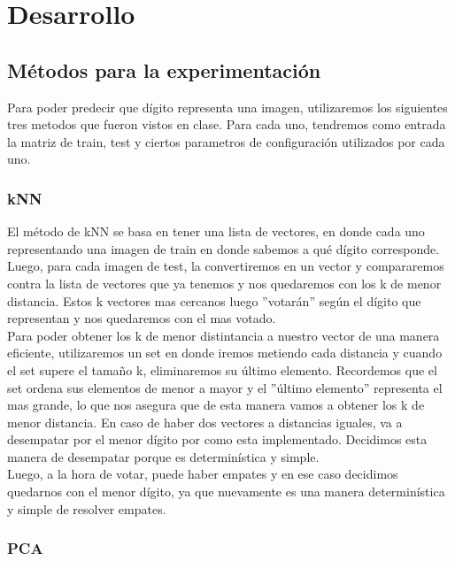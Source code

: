 \section{Desarrollo}

\subsection{M\'etodos para la experimentaci\'on}

Para poder predecir que d\'igito representa una imagen, utilizaremos los siguientes tres metodos que fueron vistos en clase. Para cada uno, tendremos como entrada la matriz de train, test y ciertos parametros de configuraci\'on utilizados por cada uno.

\subsubsection{kNN}

El m\'etodo de kNN se basa en tener una lista de vectores, en donde cada uno representando una imagen de train en donde sabemos a qu\'e d\'igito corresponde. Luego, para cada imagen de test, la convertiremos en un vector y compararemos contra la lista de vectores que ya tenemos y nos quedaremos con los k de menor distancia. Estos k vectores mas cercanos luego ''votar\'an'' seg\'un el d\'igito que representan y nos quedaremos con el mas votado.\\

Para poder obtener los k de menor distintancia a nuestro vector de una manera eficiente, utilizaremos un set en donde iremos metiendo cada distancia y cuando el set supere el tama\~no k, eliminaremos su \'ultimo elemento. Recordemos que el set ordena sus elementos de menor a mayor y el ''\'ultimo elemento'' representa el mas grande, lo que nos asegura que de esta manera vamos a obtener los k de menor distancia. En caso de haber dos vectores a distancias iguales, va a desempatar por el menor d\'igito por como esta implementado. Decidimos esta manera de desempatar porque es determin\'istica y simple.\\
Luego, a la hora de votar, puede haber empates y en ese caso decidimos quedarnos con el menor d\'igito, ya que nuevamente es una manera determin\'istica y simple de resolver empates. 

\subsubsection{PCA}

